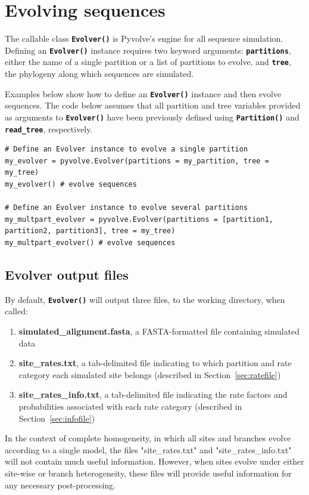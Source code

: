 \documentclass{article}
\newcommand{\code}[1]{\textbf{\texttt{\small{#1}}}}
\begin{document}
\section{Evolving sequences}\label{sec:evolver}

The callable class \code{Evolver()} is Pyvolve's engine for all sequence simulation. Defining an \code{Evolver()} instance requires two keyword arguments: \code{partitions}, either the name of a single partition or a list of partitions to evolve, and \code{tree}, the phylogeny along which sequences are simulated.

Examples below show how to define an \code{Evolver()} instance and then evolve sequences. The code below assumes that all partition and tree variables provided as arguments to \code{Evolver()} have been previously defined using \code{Partition()} and \code{read\_tree}, respectively.
\begin{lstlisting}
# Define an Evolver instance to evolve a single partition
my_evolver = pyvolve.Evolver(partitions = my_partition, tree = my_tree)
my_evolver() # evolve sequences

# Define an Evolver instance to evolve several partitions
my_multpart_evolver = pyvolve.Evolver(partitions = [partition1, partition2, partition3], tree = my_tree)
my_multpart_evolver() # evolve sequences
\end{lstlisting}



\subsection{Evolver output files}\label{sec:output_files}

By default, \code{Evolver()} will output three files, to the working directory, when called:
\begin{enumerate}
	\item \textbf{simulated\_alignment.fasta}, a FASTA-formatted file containing simulated data
	\item \textbf{site\_rates.txt}, a tab-delimited file indicating to which partition and rate category each simulated site belongs (described in Section~\ref{sec:ratefile})
	\item \textbf{site\_rates\_info.txt}, a tab-delimited file indicating the rate factors and probabilities associated with each rate category (described in Section~\ref{sec:infofile})
\end{enumerate}


In the context of complete homogeneity, in which all sites and branches evolve according to a single model, the files "site\_rates.txt" and "site\_rates\_info.txt" will not contain much useful information. However, when sites evolve under either site-wise or branch heterogeneity, these files will provide useful information for any necessary post-processing.
\end{document}
